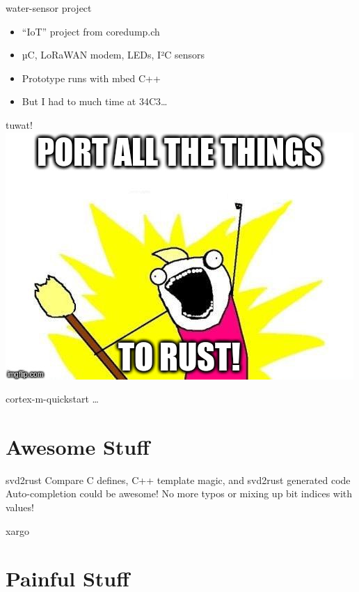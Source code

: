 \documentclass[aspectratio=1610,14pt,t]{beamer}
\begin{document}
\begin{frame}[c]{water-sensor project}
  \begin{itemize}
    \item ``IoT'' project from coredump.ch
    \item µC, LoRaWAN modem, LEDs, I²C sensors
    \item Prototype runs with mbed C++
    \item<2-> But I had to much time at 34C3\ldots
  \end{itemize}
\end{frame}

\begin{frame}[c]{tuwat!}
  \centering
  \includegraphics[width=.8\textwidth]{img/port-all-the-things.jpg}
\end{frame}

\begin{frame}[c]{cortex-m-quickstart}
  \ldots
\end{frame}

\section{Awesome Stuff}

\begin{frame}[c]{svd2rust}
  Compare C defines, C++ template magic, and svd2rust generated code
  Auto-completion could be awesome!
  No more typos or mixing up bit indices with values!
\end{frame}

\begin{frame}[c]{xargo}
\end{frame}

\section{Painful Stuff}
\end{document}
